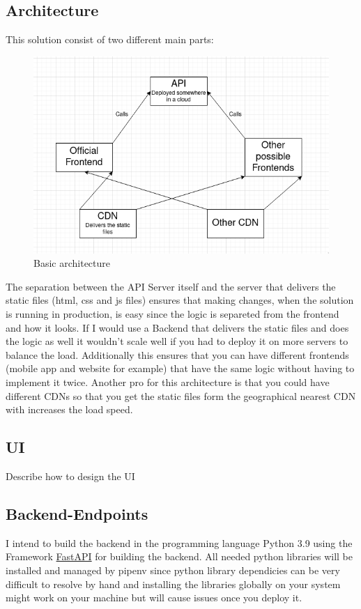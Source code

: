 \documentclass{article}
\begin{document}
\subsection{Architecture}
This solution consist of two different main parts:
\begin{figure}
    \includegraphics[width=\linewidth]{architecture.jpeg}
    \caption{Basic architecture}
\end{figure}
The separation between the API Server itself and the server that delivers the static files (html, css and js files) ensures that making changes, when the solution is running in production, is easy since the logic is separeted from the frontend and how it looks. If I would use a Backend that delivers the static files and does the logic as well it wouldn't scale well if you had to deploy it on more servers to balance the load. Additionally this ensures that you can have different frontends (mobile app and website for example) that have the same logic without having to implement it twice. Another pro for this architecture is that you could have different CDNs so that you get the static files form the geographical nearest CDN with increases the load speed.

\subsection{UI}
Describe how to design the UI
\subsection{Backend-Endpoints}
I intend to build the backend in the programming language Python 3.9 using the Framework \href{https://fastapi.tiangolo.com/}{FastAPI} for building the backend. All needed python libraries will be installed and managed by pipenv since python library dependicies can be very difficult to resolve by hand and installing the libraries globally on your system might work on your machine but will cause issues once you deploy it.
\end{document}
